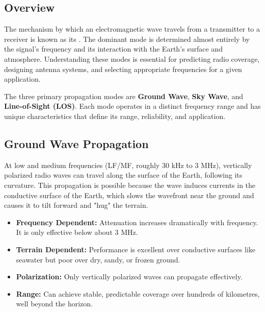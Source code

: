 \subsection{Overview}

The mechanism by which an electromagnetic wave travels from a transmitter to a receiver is known as its . The dominant mode is determined almost entirely by the signal's frequency and its interaction with the Earth's surface and atmosphere. Understanding these modes is essential for predicting radio coverage, designing antenna systems, and selecting appropriate frequencies for a given application.

\begin{keyconcept}
    The three primary propagation modes are \textbf{Ground Wave}, \textbf{Sky Wave}, and \textbf{Line-of-Sight (LOS)}. Each mode operates in a distinct frequency range and has unique characteristics that define its range, reliability, and application.
\end{keyconcept}


\subsection{Ground Wave Propagation}

At low and medium frequencies (LF/MF, roughly 30 kHz to 3 MHz), vertically polarized radio waves can travel along the surface of the Earth, following its curvature. This  propagation is possible because the wave induces currents in the conductive surface of the Earth, which slows the wavefront near the ground and causes it to tilt forward and "hug" the terrain.

\begin{itemize}
    \item \textbf{Frequency Dependent:} Attenuation increases dramatically with frequency. It is only effective below about 3 MHz.
    \item \textbf{Terrain Dependent:} Performance is excellent over conductive surfaces like seawater but poor over dry, sandy, or frozen ground.
    \item \textbf{Polarization:} Only vertically polarized waves can propagate effectively.
    \item \textbf{Range:} Can achieve stable, predictable coverage over hundreds of kilometres, well beyond the horizon.
\end{itemize}

